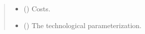 \documentclass[letterpaper,10pt,english]{sphinxmanual}
\begin{document}
\begin{fulllineitems}
\begin{quote}
\begin{description}
\begin{itemize}
\item {} 
 () \textendash{} Costs.

\item {} 
 () \textendash{} The technological parameterization.

\end{itemize}

\end{description}\end{quote}

\end{fulllineitems}

\end{document}
